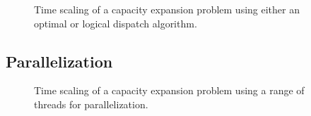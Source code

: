 \begin{figure}[htbp!]
    \centering
    \resizebox{0.75\columnwidth}{!}{}
    \caption{Time scaling of a capacity expansion problem using either an optimal or logical dispatch algorithm.}
    \label{fig:alg-scaling}
\end{figure}


\subsection{Parallelization}


\begin{figure}[htbp!]
    \centering
    \resizebox{0.75\columnwidth}{!}{}
    \caption{Time scaling of a capacity expansion problem using a range of threads for parallelization.}
    \label{fig:thread-scaling}
\end{figure}

\FloatBarrier